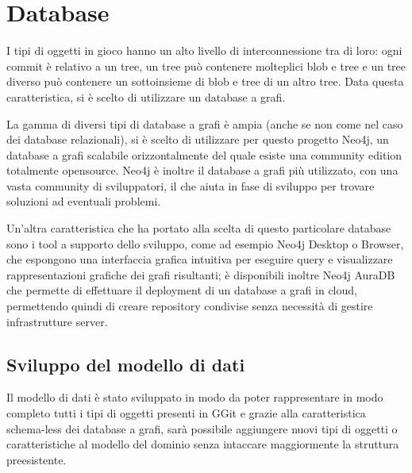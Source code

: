\section{Database}
\label{sec:database}
I tipi di oggetti in gioco hanno un alto livello di interconnessione tra di loro: ogni commit è relativo a un tree, un tree può contenere molteplici blob e tree e un tree diverso può contenere un sottoinsieme di blob e tree di un altro tree. Data questa caratteristica, si è scelto di utilizzare un database a grafi.

La gamma di diversi tipi di database a grafi è ampia (anche se non come nel caso dei database relazionali), si è scelto di utilizzare per questo progetto Neo4j, un database a grafi scalabile orizzontalmente del quale esiste una community edition totalmente opensource\cite{neo4jgit}. Neo4j è inoltre il database a grafi più utilizzato\cite{db-engines_2022}, con una vasta community di sviluppatori, il che aiuta in fase di sviluppo per trovare soluzioni ad eventuali problemi.

Un'altra caratteristica che ha portato alla scelta di questo particolare database sono i tool a supporto dello sviluppo, come ad esempio Neo4j Desktop o Browser, che espongono una interfaccia grafica intuitiva per eseguire query e visualizzare rappresentazioni grafiche dei grafi risultanti; è disponibili inoltre Neo4j AuraDB che permette di effettuare il deployment di un database a grafi in cloud, permettendo quindi di creare repository condivise senza necessità di gestire infrastrutture server.

\subsection{Sviluppo del modello di dati}
\label{sec:datamodel}
Il modello di dati è stato sviluppato in modo da poter rappresentare in modo completo tutti i tipi di oggetti presenti in GGit e grazie alla caratteristica schema-less dei database a grafi, sarà possibile aggiungere nuovi tipi di oggetti o caratteristiche al modello del dominio senza intaccare maggiormente la struttura preesistente.

